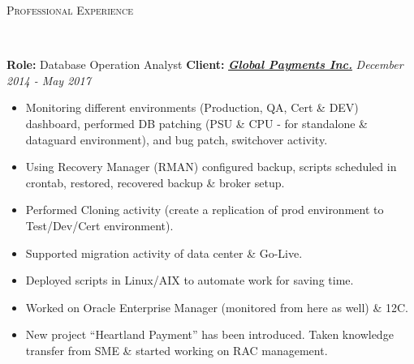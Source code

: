 \documentclass[9pt]{article}
\newenvironment{changemargin}[2]{%
  \begin{list}{}{%
    \setlength{\topsep}{0pt}%
    \setlength{\leftmargin}{#1}%
    \setlength{\rightmargin}{#2}%
    \setlength{\listparindent}{\parindent}%
    \setlength{\itemindent}{\parindent}%
    \setlength{\parsep}{\parskip}%
  }%
  \item[]}{\end{list}
}
\newcommand{\lineover}{
	\begin{changemargin}{-0.05in}{-0.05in}
		\vspace*{-8pt}
		\hrulefill \\
		\vspace*{-2pt}
	\end{changemargin}
}
\newcommand{\header}[1]{
	\begin{changemargin}{-0.5in}{-0.5in}
		\scshape{#1}\\
  	\lineover
	\end{changemargin}
}
\newenvironment{body} {
	\vspace*{-16pt}
	\begin{changemargin}{-0.25in}{-0.5in}
  }
	{\end{changemargin}
}
\begin{document}
\header{Professional Experience}
\begin{body}
	\vspace{14pt}
        \textbf{Role:} Database Operation Analyst \hfill \textbf{Client:} \textbf{\emph{\href{https://www.globalpaymentsinc.com/en-us}{Global Payments Inc.}}} \hfill \emph{December 2014 - May 2017}\\
	\vspace*{-4pt}
	\begin{itemize} \itemsep -0pt
          \item Monitoring different environments (Production, QA, Cert \& DEV) dashboard,
performed DB patching (PSU \& CPU - for standalone \& dataguard environment), and
bug patch, switchover activity.
          \item Using Recovery Manager (RMAN) configured backup, scripts scheduled in crontab,
restored, recovered backup \& broker setup.
          \item Performed Cloning activity (create a replication of prod environment to Test/Dev/Cert
environment).
          \item Supported migration activity of data center \& Go-Live.
          \item Deployed scripts in Linux/AIX to automate work for saving time.
          \item Worked on Oracle Enterprise Manager (monitored from here as well) \& 12C.
          \item New project “Heartland Payment” has been introduced. Taken knowledge transfer
from SME \& started working on RAC management.
	\end{itemize}

	\vspace*{2pt}


\end{body}
\end{document}
